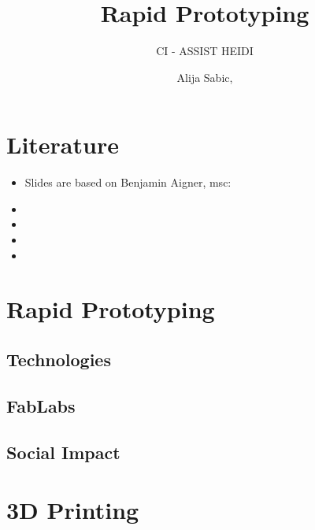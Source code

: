 \documentclass[aspectratio=169]{beamer}
\title[Rapid Prototyping]{Rapid Prototyping}
\subtitle{CI - ASSIST HEIDI}
\author{Alija Sabic, \glsentrytext{msc}}
\institute{Department Electronic Engineering}
\begin{document}
\begin{frame}[plain]
    \titlepage
    \nocite{aigner:rapid-prototyping}
    \nocite{fasterman:2012}
    \nocite{benchoff:2014:1}
    \nocite{benchoff:2014:2}
    \nocite{hubs}
\end{frame}

\section{Literature}

\begin{frame}
    \begin{itemize}
        \item Slides are based on Benjamin Aigner, \acs{msc}: 
        \item {}
        \item {}
        \item {}
        \item {}
    \end{itemize}
\end{frame}

\section{Rapid Prototyping}


\subsection{Technologies}

\subsection{}

\subsection{FabLabs}

\subsection{Social Impact}


\section{3D Printing}

\subsection{}

\end{document}
